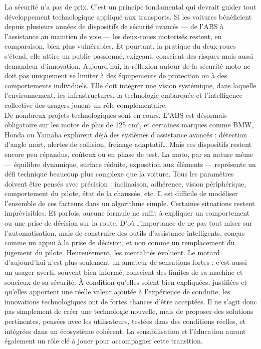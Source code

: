 La sécurité n’a pas de prix. C’est un principe fondamental qui devrait guider tout développement technologique appliqué aux transports. Si les voitures bénéficient depuis plusieurs années de dispositifs de sécurité avancés — de l’ABS à l’assistance au maintien de voie — les deux-roues motorisés restent, en comparaison, bien plus vulnérables. Et pourtant, la pratique du deux-roues s’étend, elle attire un public passionné, exigeant, conscient des risques mais aussi demandeur d’innovation.
Aujourd’hui, la réflexion autour de la sécurité moto ne doit pas uniquement se limiter à des équipements de protection ou à des comportements individuels. Elle doit intégrer une vision systémique, dans laquelle l’environnement, les infrastructures, la technologie embarquée et l’intelligence collective des usagers jouent un rôle complémentaire.\\
De nombreux projets technologiques sont en cours. L’ABS est désormais obligatoire sur les motos de plus de 125 cm³, et certaines marques comme BMW, Honda ou Yamaha explorent déjà des systèmes d’assistance avancés : détection d’angle mort, alertes de collision, freinage adaptatif… Mais ces dispositifs restent encore peu répandus, coûteux ou en phase de test. La moto, par sa nature même — équilibre dynamique, surface réduite, exposition aux éléments — représente un défi technique beaucoup plus complexe que la voiture. Tous les paramètres doivent être pensés avec précision : inclinaison, adhérence, vision périphérique, comportement du pilote, état de la chaussée, etc.
Il est difficile de modéliser l’ensemble de ces facteurs dans un algorithme simple. Certaines situations restent imprévisibles. Et parfois, aucune formule ne suffit à expliquer un comportement ou une prise de décision sur la route. D’où l’importance de ne pas tout miser sur l’automatisation, mais de construire des outils d’assistance intelligents, conçus comme un appui à la prise de décision, et non comme un remplacement du jugement du pilote.
Heureusement, les mentalités évoluent. Le motard d’aujourd’hui n’est plus seulement un amateur de sensations fortes ; c’est aussi un usager averti, souvent bien informé, conscient des limites de sa machine et soucieux de sa sécurité. À condition qu’elles soient bien expliquées, justifiées et qu’elles apportent une réelle valeur ajoutée à l’expérience de conduite, les innovations technologiques ont de fortes chances d’être acceptées.
Il ne s’agit donc pas simplement de créer une technologie nouvelle, mais de proposer des solutions pertinentes, pensées avec les utilisateurs, testées dans des conditions réelles, et intégrées dans un écosystème cohérent. La sensibilisation et l’éducation auront également un rôle clé à jouer pour accompagner cette transition.
